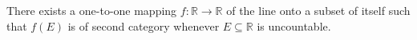 There exists a one-to-one mapping $f : \mathbb{R} \to \mathbb{R}$ of the line onto a subset of itself such that $f(E)$ is of second category whenever $E \subseteq \mathbb{R}$ is uncountable.
